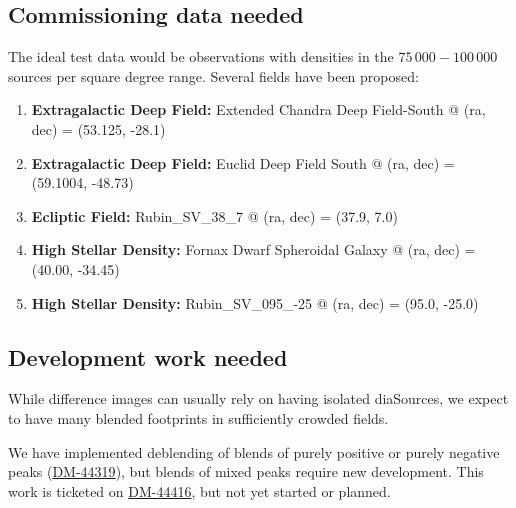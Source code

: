 \subsection{Commissioning data needed}
The ideal test data would be observations with densities in the \( 75\,000 - 100\,000 \) sources per square degree range. Several fields have been proposed:
\begin{enumerate}
\item \textbf{Extragalactic Deep Field:} Extended Chandra Deep Field-South @ (ra, dec) = (53.125, -28.1)
\item \textbf{Extragalactic Deep Field:} Euclid Deep Field South @ (ra, dec) = (59.1004, -48.73)
\item \textbf{Ecliptic Field:} Rubin\_SV\_38\_7 @ (ra, dec) = (37.9, 7.0)
\item \textbf{High Stellar Density:} Fornax Dwarf Spheroidal Galaxy @ (ra, dec) = (40.00, -34.45)
\item \textbf{High Stellar Density:} Rubin\_SV\_095\_-25 @ (ra, dec) = (95.0, -25.0)
\end{enumerate}

\subsection{Development work needed}
While difference images can usually rely on having isolated diaSources, we expect to have many blended footprints in sufficiently crowded fields. 

We have implemented deblending of blends of purely positive or purely negative peaks (\href{https://rubinobs.atlassian.net/browse/DM-44319}{DM-44319}), but blends of mixed peaks require new development.
This work is ticketed on \href{https://rubinobs.atlassian.net/browse/DM-44416}{DM-44416}, but not yet started or planned.

